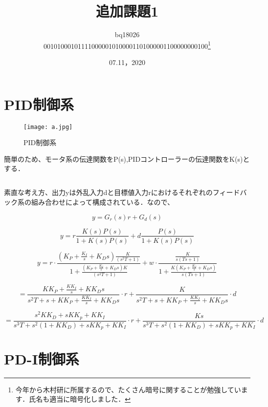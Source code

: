 \documentclass[xelatex,ja=standard,jafont=noto]{bxjsarticle}
\title{追加課題1}
\author{bq18026\\001010001011110000010100001101000001100000000100\footnote{今年から木村研に所属するので、たくさん暗号に関することが勉強しています．氏名も適当に暗号化しました．}}
\date{07.11，2020}
\begin{document}
\maketitle

\section{PID制御系}

\begin{figure}[h!]
    \centering
    \texttt{[image: a.jpg]}
    \caption{PID制御系}
\end{figure}

簡単のため、モータ系の伝達関数をP(s),PIDコントローラーの伝達関数をK(s)とする．\\

\subsection{}
素直な考え方、出力yは外乱入力dと目標値入力rにおけるそれぞれのフィードバック系の組み合わせによって構成されている．なので、

\begin{equation}
    y=G_{r}(s)r+G_{d}(s)
\end{equation}

\begin{equation}
    y=r\frac{K(s)P(s)}{1+K(s)P(s)}+d\frac{P(s)}{1+K(s)P(s)}
\end{equation}

\begin{equation}
    y=r\cdot\frac{(K_{P}+\frac{K_{I}}{s}+K_{D}s)\frac{K}{(s^{2}T+1)}}{1+\frac{(K_{P}+\frac{K_{I}}{s}+K_{D}s)K}{(s^{2}T+1)}}+w\cdot\frac{\frac{K}{s(Ts+1)}}{1+\frac{K(K_{P}+\frac{K_{I}}{s}+K_{D}s)}{s(Ts+1)}}
\end{equation}
	
	\begin{equation}
	    =\frac{KK_{P}+\frac{KK_{I}}{s}+KK_{D}s}{s^{2}T+s+KK_{P}+\frac{KK_{I}}{s}+KK_{D}s}\cdot r+\frac{K}{s^{2}T+s+KK_{P}+\frac{KK_{I}}{s}+KK_{D}s}\cdot d
	\end{equation}
	
	\begin{equation}
	    =\frac{s^{2}KK_{D}+sKK_{p}+KK_{I}}{s^{3}T+s^{2}(1+KK_{D})+sKK_{p}+KK_{I}}\cdot r+\frac{Ks}{s^{3}T+s^{2}(1+KK_{D})+sKK_{p}+KK_{I}}\cdot d
	\end{equation}
	
	
	\section{PD-I制御系}
	
\end{document}
